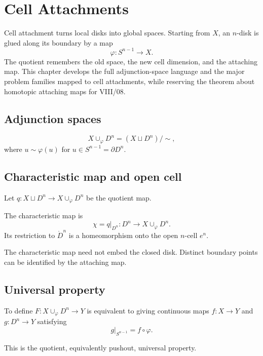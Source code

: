 ﻿\chapter{Cell Attachments}
\label{ch:viii05-cell-attachments}

Cell attachment turns local disks into global spaces.  Starting from \(X\), an
\(n\)-disk is glued along its boundary by a map
\[
\varphi:S^{n-1}\to X.
\]
The quotient remembers the old space, the new cell dimension, and the attaching
map.  This chapter develops the full adjunction-space language and the major
problem families mapped to cell attachments, while reserving the theorem about
homotopic attaching maps for VIII/08.

\section{Adjunction spaces}
\begin{definition}\label{def:viii05-attach}
\[
X\cup_\varphi D^n=(X\sqcup D^n)/\!\sim,
\]
where \(u\sim\varphi(u)\) for \(u\in S^{n-1}=\partial D^n\).
\end{definition}

\section{Characteristic map and open cell}
Let \(q:X\sqcup D^n\to X\cup_\varphi D^n\) be the quotient map.

\begin{definition}\label{def:viii05-characteristic}
The characteristic map is
\[
\chi=q|_{D^n}:D^n\to X\cup_\varphi D^n.
\]
Its restriction to \(\mathring D^n\) is a homeomorphism onto the open
\(n\)-cell \(e^n\).
\end{definition}

\begin{warning}\label{warn:viii05-boundary}
The characteristic map need not embed the closed disk.  Distinct boundary
points can be identified by the attaching map.
\end{warning}

\section{Universal property}
\begin{proposition}\label{prop:viii05-universal}
To define \(F:X\cup_\varphi D^n\to Y\) is equivalent to giving continuous maps
\(f:X\to Y\) and \(g:D^n\to Y\) satisfying
\[
g|_{S^{n-1}}=f\circ\varphi.
\]
\end{proposition}
This is the quotient, equivalently pushout, universal property.

